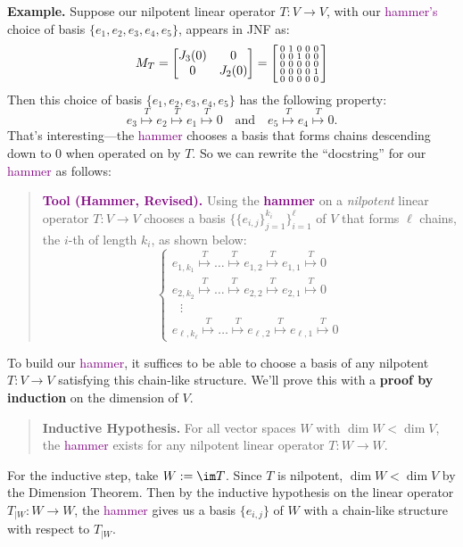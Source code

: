 \textbf{Example.} Suppose our nilpotent linear operator $T: V \to V$, with our \textcolor{purple}{hammer's} choice of basis $\{e_1, e_2, e_3, e_4, e_5\}$, appears in JNF as:
\[ M_T = \begin{bmatrix} J_3(0) & 0 \\ 0 & J_2(0) \end{bmatrix} = \begin{bsmallmatrix} 0 & 1 & 0 & 0 & 0 \\ 0 & 0 & 1 & 0 & 0 \\ 0 & 0 & 0 & 0 & 0 \\ 0 & 0 & 0 & 0 & 1 \\ 0 & 0 & 0 & 0 & 0 \end{bsmallmatrix} \]
Then this choice of basis $\{e_1, e_2, e_3, e_4, e_5\}$ has the following property:
\[ e_3 \stackrel{T}{\mapsto} e_2 \stackrel{T}{\mapsto} e_1 \stackrel{T}{\mapsto} 0 ~~~ \text{ and } ~~~ e_5 \stackrel{T}{\mapsto} e_4 \stackrel{T}{\mapsto} 0. \]
That's interesting---the \textcolor{purple}{hammer} chooses a basis that forms chains descending down to $0$ when operated on by $T$.  So we can rewrite the ``docstring'' for our \textcolor{purple}{hammer} as follows:

\begin{quote}
    \textcolor{purple}{\textbf{Tool (Hammer, Revised).}} Using the \textcolor{purple}{\textbf{hammer}} on a \emph{nilpotent} linear operator $T: V \to V$ chooses a basis $\{\{e_{i, j}\}_{j = 1}^{k_i}\}_{i = 1}^{\ell}$ of $V$ that forms $\ell$ chains, the $i$-th of length $k_i$, as shown below:
\[
\begin{cases}
e_{1, k_1} \stackrel{T}{\mapsto} \dots \stackrel{T}{\mapsto} e_{1, 2} \stackrel{T}{\mapsto} e_{1, 1} \stackrel{T}{\mapsto} 0 \\
e_{2, k_2} \stackrel{T}{\mapsto} \dots \stackrel{T}{\mapsto} e_{2, 2} \stackrel{T}{\mapsto} e_{2, 1} \stackrel{T}{\mapsto} 0 \\
~~~\vdots \\
e_{\ell, k_{\ell}} \stackrel{T}{\mapsto} \dots \stackrel{T}{\mapsto} e_{\ell, 2} \stackrel{T}{\mapsto} e_{\ell, 1} \stackrel{T}{\mapsto} 0
\end{cases}
\]
\end{quote}

To build our \textcolor{purple}{hammer}, it suffices to be able to choose a basis of any nilpotent $T: V \to V$ satisfying this chain-like structure.  We'll prove this with a \textbf{proof by induction} on the dimension of $V$.
\begin{quote}
    \textbf{Inductive Hypothesis.} For all vector spaces $W$ with $\dim W < \dim V$, the \textcolor{purple}{hammer} exists for any nilpotent linear operator $T: W \to W$.
\end{quote}
For the inductive step, take $W := \im T$.  Since $T$ is nilpotent, $\dim W < \dim V$ by the Dimension Theorem.  Then by the inductive hypothesis on the linear operator $T_{|W}: W \to W$, the \textcolor{purple}{hammer} gives us a basis $\{e_{i, j}\}$ of $W$ with a chain-like structure with respect to $T_{|W}$.

